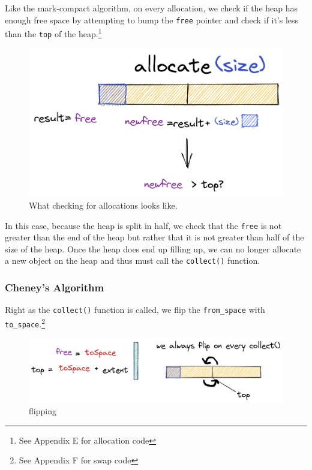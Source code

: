 \documentclass[index]{subfiles}
\begin{document}
Like the mark-compact algorithm, on every allocation, we check if the heap has enough free space by attempting to bump the \verb+free+ pointer and check if it's less than the \verb+top+ of the heap.\footnote{See Appendix E for allocation code}

\begin{figure}[H]
    \centering
    \includegraphics[scale=0.3]{pics/allocation.png}
    \caption{What checking for allocations looks like.}
\end{figure}

In this case, because the heap is split in half, we check that the \verb+free+ is not greater than the end of the heap but rather that it is not greater than half of the size of the heap. Once the heap does end up filling up, we can no longer allocate a new object on the heap and thus must call the \verb+collect()+ function.

\subsubsection{Cheney's Algorithm}

Right as the \verb+collect()+ function is called, we flip the \verb+from_space+ with \verb+to_space+.\footnote{See Appendix F for swap code}

\begin{figure}[H]
    \centering
    \includegraphics[scale=0.25]{pics/flipping.png}
    \caption{flipping}
\end{figure}
\end{document}
